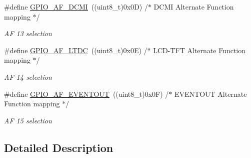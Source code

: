 \begin{DoxyCompactItemize}
\item 
\mbox{\label{group___g_p_i_o___alternat__function__selection__define_gaa7bfafac663bac5d437bd6d6a2f6774d}} 
\#define \mbox{\hyperlink{group___g_p_i_o___alternat__function__selection__define_gaa7bfafac663bac5d437bd6d6a2f6774d}{G\+P\+I\+O\+\_\+\+A\+F\+\_\+\+D\+C\+MI}}~((uint8\+\_\+t)0x0\+D)  /$\ast$ D\+C\+M\+I Alternate Function mapping $\ast$/
\begin{DoxyCompactList}\small\item\em AF 13 selection ~\newline
 \end{DoxyCompactList}\item 
\mbox{\label{group___g_p_i_o___alternat__function__selection__define_ga4a107e7ac82549bd9df715924c715f2e}} 
\#define \mbox{\hyperlink{group___g_p_i_o___alternat__function__selection__define_ga4a107e7ac82549bd9df715924c715f2e}{G\+P\+I\+O\+\_\+\+A\+F\+\_\+\+L\+T\+DC}}~((uint8\+\_\+t)0x0\+E)  /$\ast$ L\+C\+D-\/\+T\+F\+T Alternate Function mapping $\ast$/
\begin{DoxyCompactList}\small\item\em AF 14 selection ~\newline
 \end{DoxyCompactList}\item 
\mbox{\label{group___g_p_i_o___alternat__function__selection__define_gacd5e7846b3709cddbf41ece2b1fb068e}} 
\#define \mbox{\hyperlink{group___g_p_i_o___alternat__function__selection__define_gacd5e7846b3709cddbf41ece2b1fb068e}{G\+P\+I\+O\+\_\+\+A\+F\+\_\+\+E\+V\+E\+N\+T\+O\+UT}}~((uint8\+\_\+t)0x0\+F)  /$\ast$ E\+V\+E\+N\+T\+O\+U\+T Alternate Function mapping $\ast$/
\begin{DoxyCompactList}\small\item\em AF 15 selection ~\newline
 \end{DoxyCompactList}\end{DoxyCompactItemize}


\subsection{Detailed Description}
